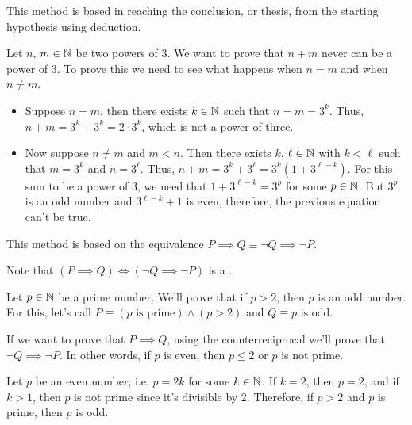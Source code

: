 
\begin{defn}
    This method is based in reaching the conclusion, or thesis, from the starting hypothesis using deduction.
\end{defn}

\begin{example}
    Let $n$, $m\in\N$ be two powers of 3. We want to prove that $n + m$ never can be a power of $3$. To prove this we need
    to see what happens when $n = m$ and when $n\neq m$.
    \begin{itemize}[itemsep = -2pt, topsep = -1pt]
        \item Suppose $n = m$, then there exists $k\in\N$ such that $n = m = 3^k$. Thus, $n + m = 3^k + 3^k = 2\cdot 3^k$,
            which is not a power of three.
        \item Now suppose $n\neq m$ and $m < n$. Then there exists $k$, $\ell\in\N$ with $k < \ell$ such that $m = 3^k$ and
            $n = 3^\ell$. Thus, $n + m = 3^k + 3^\ell = 3^k\left(1 + 3^{\ell - k}\right)$. For this sum to be a power of 3,
            we need that $1 + 3^{\ell - k} = 3^p$ for some $p\in\N$. But $3^p$ is an odd number and $3^{\ell - k} + 1$ is even,
            therefore, the previous equation can't be true.
    \end{itemize}
\end{example}

\begin{defn}[Counterreciprocal]
    This method is based on the equivalence $P\implies Q\equiv \neg Q\implies\neg P$.
\end{defn}

\begin{remark}
    Note that $\left(P\implies Q\right)\iff \left(\neg Q\implies\neg P\right)$ is a .
\end{remark}

\begin{example}
    Let $p\in\N$ be a prime number. We'll prove that if $p > 2$, then $p$ is an odd number. For this, let's call 
    $P\equiv\left(p\textrm{ is prime}\right)\land\left(p > 2\right)$ and $Q\equiv p\textrm{ is odd}$. 
    
    If we want to prove
    that $P\implies Q$, using the counterreciprocal we'll prove that $\neg Q\implies\neg P$. In other words, if $p$ is even,
    then $p\leq 2$ or $p$ is not prime.

    Let $p$ be an even number; i.e. $p = 2k$ for some $k\in\N$. If $k = 2$, then $p = 2$, and if $k > 1$, then $p$ is not 
    prime since it's divisible by 2. Therefore, if $p > 2$ and $p$ is prime, then $p$ is odd.
\end{example}

